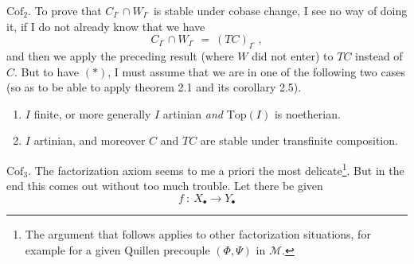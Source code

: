 \documentclass[11pt]{article}
\newcommand{\M}{\mathcal{M}}
\begin{document}
$\mathrm{Cof}_2$. To prove that $C_{I^\circ} \cap W_{I^\circ}$ is stable under cobase change, I see no way of doing it, if I do not already know that we have
\[ C_{I^\circ} \cap W_{I^\circ} \ = \ (TC)_{I^\circ}\ , \tag*{$(*)$} \]
and then we apply the preceding result (where $W$ did not enter) to $TC$ instead of $C$. But to have $(*)$, I must assume that we are in one of the following two cases (so as to be able to apply theorem 2.1 and its corollary 2.5).
\begin{enumerate}[leftmargin=2.5em]
\item[a)] $I$ finite, or more generally $I$ artinian \textit{and} $\mathrm{Top}(I)$ is noetherian.
\item[b)] $I$ artinian, and moreover $C$ and $TC$ are stable under transfinite composition.
\end{enumerate}
$\mathrm{Cof}_3$. The factorization axiom seems to me a priori the most delicate\footnote[15]{The argument that follows applies to other factorization situations, for example for a given Quillen precouple $(\Phi, \Psi)$ in $\M$.}. But in the end this comes out without too much trouble. Let there be given %
\[ f \ : \ X_\bullet \longrightarrow Y_\bullet \]
\end{document}
